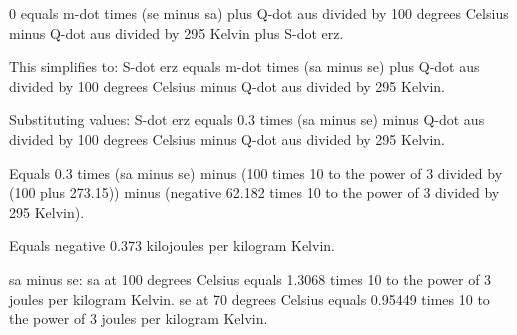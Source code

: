 0 equals m-dot times (se minus sa) plus Q-dot aus divided by 100 degrees Celsius minus Q-dot aus divided by 295 Kelvin plus S-dot erz.  

This simplifies to:  
S-dot erz equals m-dot times (sa minus se) plus Q-dot aus divided by 100 degrees Celsius minus Q-dot aus divided by 295 Kelvin.  

Substituting values:  
S-dot erz equals 0.3 times (sa minus se) minus Q-dot aus divided by 100 degrees Celsius minus Q-dot aus divided by 295 Kelvin.  

Equals 0.3 times (sa minus se) minus (100 times 10 to the power of 3 divided by (100 plus 273.15)) minus (negative 62.182 times 10 to the power of 3 divided by 295 Kelvin).  

Equals negative 0.373 kilojoules per kilogram Kelvin.  

sa minus se:  
sa at 100 degrees Celsius equals 1.3068 times 10 to the power of 3 joules per kilogram Kelvin.  
se at 70 degrees Celsius equals 0.95449 times 10 to the power of 3 joules per kilogram Kelvin.